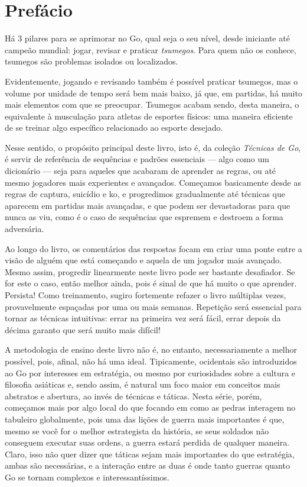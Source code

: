 \chapter{Prefácio}

Há 3 pilares para se aprimorar no Go, qual seja o seu nível, desde iniciante até campeão mundial: jogar, revisar e praticar \emph{tsumegos}. Para quem não os conhece, tsumegos são problemas isolados ou localizados.

Evidentemente, jogando e revisando também é possível praticar tsumegos, mas o volume por unidade de tempo será bem mais baixo, já que, em partidas, há muito mais elementos com que se preocupar. Tsumegos acabam sendo, desta maneira, o equivalente à musculação para atletas de esportes físicos: uma maneira eficiente de se treinar algo específico relacionado ao esporte desejado.

Nesse sentido, o propósito principal deste livro, isto é, da coleção \emph{Técnicas de Go}, é servir de referência de sequências e padrões essenciais --- algo como um dicionário --- seja para aqueles que acabaram de aprender as regras, ou até mesmo jogadores mais experientes e avançados. Começamos basicamente desde as regras de captura, suicídio e ko, e progredimos gradualmente até técnicas que aparecem em partidas mais avançadas, e que podem ser devastadoras para que nunca as viu, como é o caso de sequências que espremem e destroem a forma adversária. 

Ao longo do livro, os comentários das respostas focam em criar uma ponte entre a visão de alguém que está começando e aquela de um jogador mais avançado. Mesmo assim, progredir linearmente neste livro pode ser bastante desafiador. Se for este o caso, então melhor ainda, pois é sinal de que há muito o que aprender. Persista! Como treinamento, sugiro fortemente refazer o livro múltiplas vezes, provavelmente espaçadas por uma ou mais semanas. Repetição será essencial para tornar as técnicas intuitivas: errar na primeira vez será fácil, errar depois da décima garanto que será muito mais difícil!

A metodologia de ensino deste livro não é, no entanto, necessariamente a melhor possível, pois, afinal, não há uma ideal. Tipicamente, ocidentais são introduzidos ao Go por interesses em estratégia, ou mesmo por curiosidades sobre a cultura e filosofia asiáticas e, sendo assim, é natural um foco maior em conceitos mais abstratos e abertura, ao invés de técnicas e táticas. Nesta série, porém, começamos mais por algo local do que focando em como as pedras interagem no tabuleiro globalmente, pois uma das lições de guerra mais importantes é que, mesmo se você for o melhor estrategista da história, se seus soldados não conseguem executar suas ordens, a guerra estará perdida de qualquer maneira. Claro, isso não quer dizer que táticas sejam mais importantes do que estratégia, ambas são necessárias, e a interação entre as duas é onde tanto guerras quanto Go se tornam complexos e interessantíssimos.

